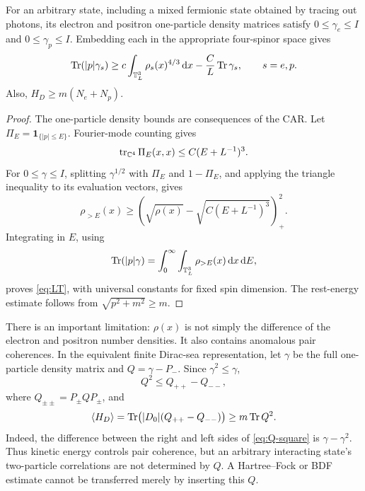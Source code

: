 \begin{lemma}
\label{lem:kinetic}
For an arbitrary state, including a mixed fermionic state obtained by
tracing out photons, its electron and positron one-particle density
matrices satisfy \(0\le\gamma_e\le I\) and \(0\le\gamma_p\le I\).
Embedding each in the appropriate four-spinor space gives
\begin{equation}
\operatorname{Tr}(|p|\gamma_s)\ge
c\int_{\mathbb T_L^3}\rho_s(x)^{4/3}\,\mathrm d x
-\frac{C}{L}\operatorname{Tr}\gamma_s,\qquad s=e,p.
\label{eq:LT}
\end{equation}
Also, \(H_D\ge m(N_e+N_p)\).
\end{lemma}
\begin{proof}
The one-particle density bounds are consequences of the CAR.
Let \(\Pi_E=\mathbf1_{\{|p|\le E\}}\). Fourier-mode counting gives
\begin{equation}
\operatorname{tr}_{\mathbb C^4}\Pi_E(x,x)\le C(E+L^{-1})^3.
\end{equation}
For \(0\le\gamma\le I\), splitting \(\gamma^{1/2}\) with \(\Pi_E\) and
\(1-\Pi_E\), and applying the triangle inequality to its evaluation
vectors, gives
\begin{equation}
\rho_{>E}(x)\ge
\left(\sqrt{\rho(x)}
-\sqrt{C(E+L^{-1})^3}\right)_+^2.
\end{equation}
Integrating in \(E\), using
\begin{equation}
\operatorname{Tr}(|p|\gamma)=\int_0^\infty\int_{\mathbb T_L^3}\rho_{>E}(x)\,\mathrm d x\,\mathrm d E,
\end{equation}
proves \eqref{eq:LT}, with universal constants for fixed spin dimension.
The rest-energy estimate follows from \(\sqrt{p^2+m^2}\ge m\).
\end{proof}
There is an important limitation: \(\rho(x)\) is not simply the difference
of the electron and positron number densities. It also contains anomalous
pair coherences. In the equivalent finite Dirac-sea representation, let
\(\gamma\) be the full one-particle density matrix and \(Q=\gamma-P_-\).
Since \(\gamma^2\le\gamma\),
\begin{equation}
Q^2\le Q_{++}-Q_{--},
\label{eq:Q-square}
\end{equation}
where \(Q_{\pm\pm}=P_\pm QP_\pm\), and
\begin{equation}
\langle H_D\rangle
=\operatorname{Tr}\bigl(|D_0|(Q_{++}-Q_{--})\bigr)
\ge m\operatorname{Tr} Q^2.
\label{eq:coherence}
\end{equation}
Indeed, the difference between the right and left sides of
\eqref{eq:Q-square} is \(\gamma-\gamma^2\).
Thus kinetic energy controls pair coherence, but an arbitrary interacting
state's two-particle correlations are not determined by \(Q\).
A Hartree--Fock or BDF estimate cannot be transferred merely by inserting this \(Q\).

